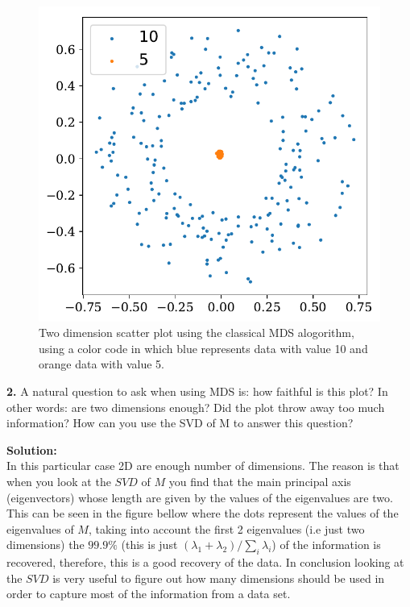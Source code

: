 \documentclass[14pt]{article}
\begin{document}
\begin{figure}[H]
\centering
\includegraphics[scale=0.5]{rings.pdf}
\caption{ Two dimension scatter plot using the classical MDS
alogorithm, using a color code in which blue represents data with
value 10 and orange data with value 5. \label{fig:rings}}
\end{figure}

\begin{mdframed}
\textbf{2.} A natural question to ask when using MDS is: how faithful
is this plot? In other words: are two dimensions enough? Did the plot
throw away too much information? How can you use the SVD of M to
answer this question?
\end{mdframed}


\textbf{Solution:}\\

In this particular case 2D are enough number of dimensions. 
The reason is that when you
look at the $SVD$ of $M$ you find that the main principal axis
(eigenvectors) whose length are given by the values of the eigenvalues
are two. This can be seen in the figure bellow where the dots
represent the values of the eigenvalues of $M$, taking into account
the first 2 eigenvalues (i.e just two dimensions) the $99.9\%$ (this is
just $(\lambda_1 + \lambda_2) / \sum_i \lambda_i$) of the
information is recovered, therefore, this is a good recovery of the
data. In conclusion looking at the $SVD$ is very
useful to figure out how many dimensions should be used in order to
capture most of the information from a data set.
\end{document}
